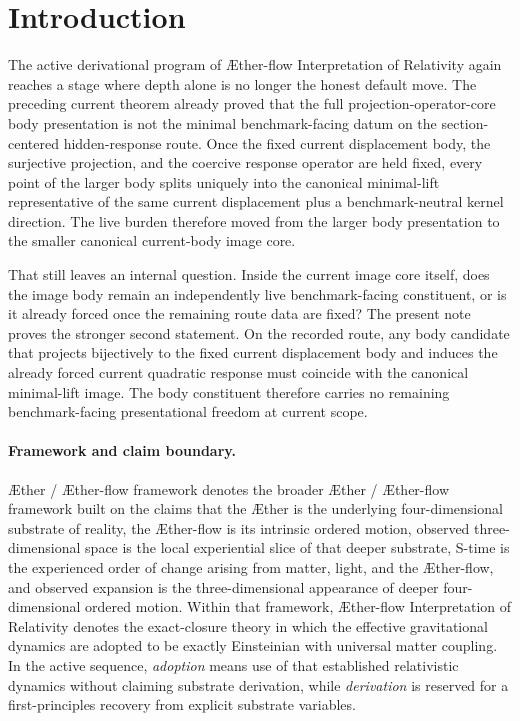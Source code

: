 \documentclass[11pt]{article}
\newcommand{\Aether}{\AE{}ther}
\newcommand{\Aflow}{\AE{}ther-flow}
\newcommand{\TheoryName}{\Aflow{} Interpretation of Relativity}
\newcommand{\TheoryProgram}{\Aether{} / \Aflow{} framework}
\begin{document}
\section{Introduction}

The active derivational program of \TheoryName{} again reaches a stage where depth alone is no longer the honest default move. The preceding current theorem already proved that the full projection-operator-core body presentation is not the minimal benchmark-facing datum on the section-centered hidden-response route. Once the fixed current displacement body, the surjective projection, and the coercive response operator are held fixed, every point of the larger body splits uniquely into the canonical minimal-lift representative of the same current displacement plus a benchmark-neutral kernel direction. The live burden therefore moved from the larger body presentation to the smaller canonical current-body image core.

That still leaves an internal question. Inside the current image core itself, does the image body remain an independently live benchmark-facing constituent, or is it already forced once the remaining route data are fixed? The present note proves the stronger second statement. On the recorded route, any body candidate that projects bijectively to the fixed current displacement body and induces the already forced current quadratic response must coincide with the canonical minimal-lift image. The body constituent therefore carries no remaining benchmark-facing presentational freedom at current scope.

\paragraph{Framework and claim boundary.}
\TheoryProgram{} denotes the broader \Aether{} / \Aflow{} framework built on the claims that the \Aether{} is the underlying four-dimensional substrate of reality, the \Aflow{} is its intrinsic ordered motion, observed three-dimensional space is the local experiential slice of that deeper substrate, S-time is the experienced order of change arising from matter, light, and the \Aflow{}, and observed expansion is the three-dimensional appearance of deeper four-dimensional ordered motion. Within that framework, \TheoryName{} denotes the exact-closure theory in which the effective gravitational dynamics are adopted to be exactly Einsteinian with universal matter coupling. In the active sequence, \emph{adoption} means use of that established relativistic dynamics without claiming substrate derivation, while \emph{derivation} is reserved for a first-principles recovery from explicit substrate variables.
\end{document}
